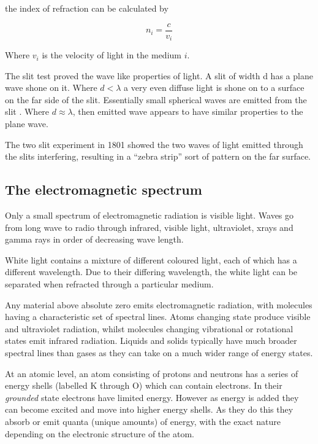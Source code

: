 the index of refraction can be calculated by 

\begin{equation}
n_i = \frac{c}{v_i}
\end{equation}

Where $v_i$ is the velocity of light in the medium $i$.

The slit test proved the wave like properties of light. A slit of width d has a plane wave shone on it. Where $d < \lambda$ a very even diffuse light is shone on to a surface on the far side of the slit. Essentially small spherical waves are emitted from the slit . Where $d \approx \lambda$, then emitted wave appears to have similar properties to the plane wave. 

The two slit experiment in 1801 showed the two waves of light emitted through the slits interfering, resulting in a ``zebra strip'' sort of pattern on the far surface. 

\subsection{The electromagnetic spectrum}

Only a small spectrum of electromagnetic radiation is visible light. Waves go from long wave to radio through infrared, visible light, ultraviolet, xrays and gamma rays in order of decreasing wave length. 

White light contains a mixture of different coloured light, each of which has a different wavelength. Due to their differing wavelength, the white light can be separated when refracted through a particular medium.

Any material above absolute zero emits electromagnetic radiation, with molecules having a characteristic set of spectral lines. Atoms changing state produce visible and ultraviolet radiation, whilst molecules changing vibrational or rotational states emit infrared radiation. Liquids and solids typically have much broader spectral lines than gases as they can take on a much wider range of energy states. 

At an atomic level, an atom consisting of protons and neutrons has a series of energy shells (labelled K through O) which can contain electrons. In their {\em grounded} state electrons have limited energy. However as energy is added they can become excited and move into higher energy shells. As they do this they absorb or emit quanta (unique amounts) of energy, with the exact nature depending on the electronic structure of the atom. 

